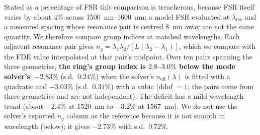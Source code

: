 \documentclass[11pt]{article}
\newcommand{\lres}{\lambda_{\mathrm{res}}}
\begin{document}
Stated as a percentage of FSR this comparison is treacherous, because FSR
itself varies by about $4\%$ across \SIrange{1500}{1600}{nm}; a model FSR
evaluated at $\lres$ and a measured spacing whose resonance pair is centred
\SI{8}{nm} away are not the same quantity. We therefore compare group
indices at matched wavelengths. Each adjacent resonance pair gives
$n_g = \lambda_1\lambda_2 / [L(\lambda_2-\lambda_1)]$, which we compare with
the FDE value interpolated at that pair's midpoint. Over ten pairs spanning the three geometries, \textbf{the ring's group index is $2.8$--$3.0\%$ below the mode solver's}: $-2.83\%$ (s.d.\ $0.24\%$) when the solver's $n_{\mathrm{eff}}(\lambda)$ is fitted with a quadratic and $-3.03\%$ (s.d.\ $0.31\%$) with a cubic (ddof $=1$; the pairs come from three geometries and are not independent). The deficit has a mild wavelength trend (about $-2.4\%$ at \SI{1520}{nm} to $-3.2\%$ at \SI{1567}{nm}). We do not use the solver's reported $n_g$ column as the reference because it is not smooth in wavelength (below); it gives $-2.73\%$ with s.d.\ $0.72\%$.
\end{document}
